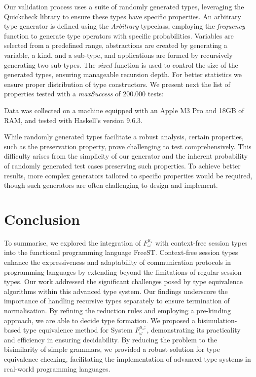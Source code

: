 \documentclass[runningheads,dvipsnames]{llncs}
\begin{document}
Our validation process uses a suite of randomly generated types, leveraging the Quickcheck library\cite{DBLP:conf/icfp/ClaessenH00} to ensure these types have specific properties. An arbitrary type generator is defined using the \textit{Arbitrary} typeclass, employing the \textit{frequency} function to generate type operators with specific probabilities. Variables are selected from a predefined range, abstractions are created by generating a variable, a kind, and a sub-type, and applications are formed by recursively generating two sub-types. The \textit{sized} function is used to control the size of the generated types, ensuring manageable recursion depth. For better statistics we ensure proper distribution of type constructors. We present next the list of properties tested with a \textit{maxSuccess} of 200.000 tests:



Data was collected on a machine equipped with an Apple M3 Pro and 18GB of RAM, and tested with Haskell's version 9.6.3.

While randomly generated types facilitate a robust analysis, certain properties, such as the preservation property, prove challenging to test comprehensively. This difficulty arises from the simplicity of our generator and the inherent probability of randomly generated test cases preserving such properties. To achieve better results, more complex generators tailored to specific properties would be required, though such generators are often challenging to design and implement. 

\section{Conclusion}\label{sec:conclusion}
 To summarise, we explored the integration of $F^{\mu_*}_\omega$ with context-free session types into the functional programming language FreeST. Context-free session types enhance the expressiveness and adaptability of communication protocols in programming languages by extending beyond the limitations of regular session types. Our work addressed the significant challenges posed by type equivalence algorithms within this advanced type system. Our findings underscore the importance of handling recursive types separately to ensure termination of normalisation. By refining the reduction rules and employing a pre-kinding approach, we are able to decide type formation.
We proposed a bisimulation-based type equivalence method for System $F^{\mu_*;}_\omega$, demonstrating its practicality and efficiency in ensuring decidability. By reducing the problem to the bisimilarity of simple grammars, we provided a robust solution for type equivalence checking, facilitating the implementation of advanced type systems in real-world programming languages.
\end{document}

